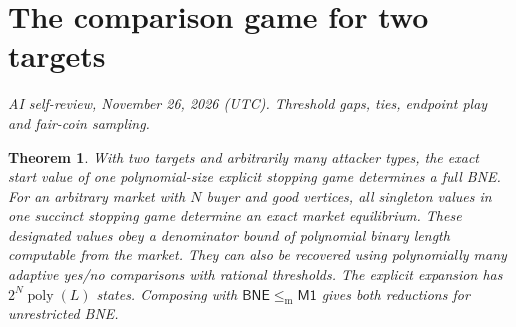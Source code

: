 \documentclass[11pt,oneside,openany,notitlepage]{report}
\newtheorem{theorem}{Theorem}[chapter]
\newcommand{\Market}{\mathsf{M1}}
\newcommand{\BNE}{\mathsf{BNE}}
\newcommand{\dd}{\mathrel{\leq_{\mathrm m}}}
\newcommand{\reviewdate}{November 26, 2026 (UTC)}
\newcommand{\reviewmark}[1]{\par\nopagebreak[4]\noindent
  {\footnotesize\itshape AI self-review, \reviewdate. #1\par}\nobreak\smallskip}
\begin{document}
\section{The comparison game for two targets}
\reviewmark{Threshold gaps, ties, endpoint play and fair-coin sampling.}
\begin{theorem}\label{thm:ssg}
With two targets and arbitrarily many attacker types, the exact start
value of one polynomial-size explicit stopping game determines a full BNE.
For an arbitrary market with \(N\) buyer and good vertices, all
singleton values in one succinct stopping game determine an exact market
equilibrium. These designated values obey a denominator bound of polynomial
binary length computable from the market. They can also be recovered using
polynomially many adaptive yes/no comparisons with rational thresholds.
The explicit expansion has \(2^N\operatorname{poly}(L)\) states. Composing
with \(\BNE\dd\Market\) gives both reductions for unrestricted BNE.
\end{theorem}
\end{document}
